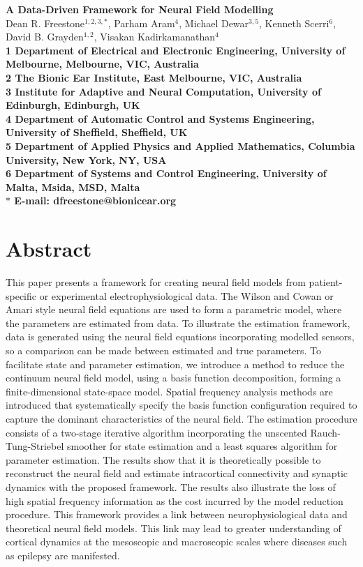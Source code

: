 \documentclass[10pt]{article}
\begin{document}
\begin{flushleft}
{\Large
\textbf{A Data-Driven Framework for Neural Field Modelling}
}
\\
Dean R. Freestone$^{1,2,3,\ast}$, 
Parham Aram$^{4}$, 
Michael Dewar$^{3,5}$,
Kenneth Scerri$^{6}$,
David B. Grayden$^{1,2}$,
Visakan Kadirkamanathan$^{4}$
\\
\bf{1} Department of Electrical and Electronic Engineering, University of Melbourne, Melbourne, VIC, Australia
\\
\bf{2} The Bionic Ear Institute, East Melbourne, VIC, Australia
\\
\bf{3} Institute for Adaptive and Neural Computation, University of Edinburgh, Edinburgh, UK
\\
\bf{4} Department of Automatic Control and Systems Engineering, University of Sheffield, Sheffield, UK
\\
\bf{5} Department of Applied Physics and Applied Mathematics, Columbia University, New York, NY, USA
\\
\bf{6} Department of Systems and Control Engineering, University of Malta, Msida, MSD, Malta
\\
$\ast$ E-mail: dfreestone@bionicear.org
\end{flushleft}

\section*{Abstract}
This paper presents a framework for creating neural field models from patient-specific or experimental electrophysiological data. The Wilson and Cowan or Amari style neural field equations are used to form a parametric model, where the parameters are estimated from data. To illustrate the estimation framework, data is generated using the neural field equations incorporating modelled sensors, so a comparison can be made between estimated and true parameters. To facilitate state and parameter estimation, we introduce a method to reduce the continuum neural field model, using a basis function decomposition, forming a finite-dimensional state-space model. Spatial frequency analysis methods are introduced that systematically specify the basis function configuration required to capture the dominant characteristics of the neural field. The estimation procedure consists of a two-stage iterative algorithm incorporating the unscented Rauch-Tung-Striebel smoother for state estimation and a least squares algorithm for parameter estimation. The results show that it is theoretically possible to reconstruct the neural field and estimate intracortical connectivity and synaptic dynamics with the proposed framework. The results also illustrate the loss of high spatial frequency information as the cost incurred by the model reduction procedure. This framework provides a link between neurophysiological data and theoretical neural field models. This link may lead to greater understanding of cortical dynamics at the mesoscopic and macroscopic scales where diseases such as epilepsy are manifested.
\end{document}
